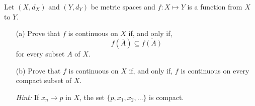 \begin{problem}[20pts]
  Let $(X,d_X)$ and $(Y,d_Y)$ be metric spaces and $f:X \mapsto Y$ is a function from $X$ to $Y$.
\begin{enumerate}

  \item[(a)] 
  Prove that $f$ is continuous on $X$ if, and only if,
\[
f(\overline{A}) \subseteq \overline{f(A)}
\]
for every subset $A$ of $X$.

  \item[(b)]  Prove that $f$ is continuous on $X$ if, and only if, $f$ is continuous on every compact subset of $X$.  

\textit{Hint:} If $x_n \to p$ in $X$, the set $\{p, x_1, x_2, \dots \}$ is compact.

 \end{enumerate}
\end{problem}